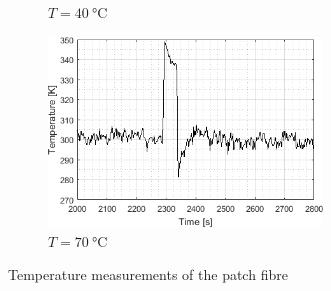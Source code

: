 \documentclass{standalone}
\begin{document}
\begin{landscape}
\begin{figure}[h]
\begin{subfigure}[b]{0.49\linewidth}
			\caption{$T = \SI{40}{\celsius}$}
		\end{subfigure}
		\begin{subfigure}[b]{0.49\linewidth}
			\centering
			\includegraphics[width=0.8\textwidth]{appendix/final_measurements_70c.png}
			\caption{$T = \SI{70}{\celsius}$}
		\end{subfigure}
		\caption{Temperature measurements of the patch fibre}
		\label{fig:final_measurements}
	\end{figure}
\end{landscape}

\setcounter{page}{\thepage-1}


\setcounter{stranica}{\thepage}
\addtocounter{stranica}{1}
\end{document}
